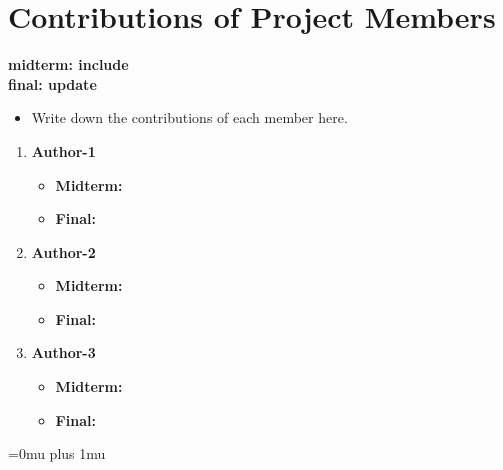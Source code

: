 \documentclass[twocolumn]{article}
\newcommand{\red}[1]{{\bf \color{red}#1}}
\newcommand{\blue}[1]{{\bf \color{blue}#1}}
\begin{document}
\section{Contributions of Project Members}
\blue{
midterm: include\\
final: update\\
}

\red{
\begin{itemize}
\itemsep0em
\item Write down the contributions of each member here.
\end{itemize}
}


\begin{enumerate}
\item {\bf Author-1}
\begin{itemize}
\item {\bf Midterm:}
\item {\bf Final:}
\end{itemize}
\item {\bf Author-2}
\begin{itemize}
\item {\bf Midterm:}
\item {\bf Final:}
\end{itemize}
\item {\bf Author-3}
\begin{itemize}
\item {\bf Midterm:}
\item {\bf Final:}
\end{itemize}
\end{enumerate}

\Urlmuskip=0mu plus 1mu\relax


\end{document}
